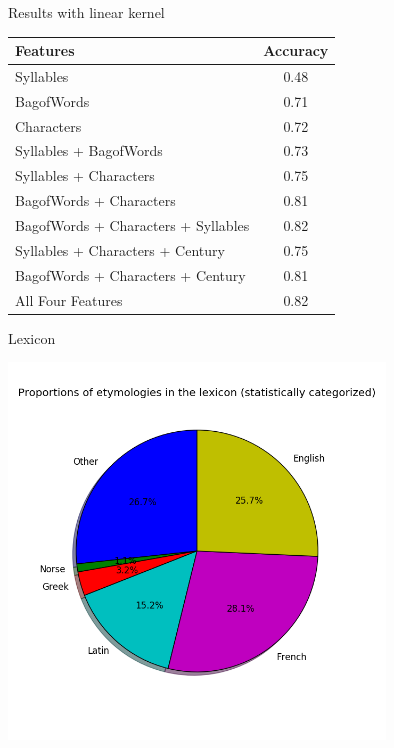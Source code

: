\documentclass[10pt]{beamer}
\begin{document}
\begin{frame}[fragile]{Results with linear kernel}

\centering
\begin{tabular}{l c}
  \hline
  Features & Accuracy \\
  \hline
  Syllables & 0.48 \\
  BagofWords & 0.71 \\
  Characters & 0.72 \\
  Syllables + BagofWords & 0.73 \\
  Syllables + Characters & 0.75 \\
  BagofWords + Characters & 0.81 \\
  BagofWords + Characters + Syllables & 0.82 \\
  Syllables + Characters + Century & 0.75 \\
  BagofWords + Characters + Century & 0.81 \\
  All Four Features & 0.82 \\

  \hline
\end{tabular}

\end{frame}















\begin{frame}[fragile]{Lexicon}

  \pause
  \centerline{\includegraphics[width=10cm]{statcategorizedlexiconpie.png}}


\end{frame}
\end{document}
